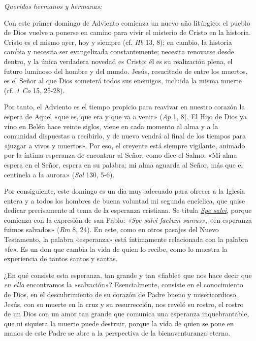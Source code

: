 \emph{Queridos hermanos y hermanas:}

Con este primer domingo de Adviento comienza un nuevo año litúrgico: el
pueblo de Dios vuelve a ponerse en camino para vivir el misterio de
Cristo en la historia. Cristo es el mismo ayer, hoy y siempre (cf.
\emph{Hb} 13, 8); en cambio, la historia cambia y necesita ser
evangelizada constantemente; necesita renovarse desde dentro, y la única
verdadera novedad es Cristo: él es su realización plena, el futuro
luminoso del hombre y del mundo. Jesús, resucitado de entre los muertos,
es el Señor al que Dios someterá todos sus enemigos, incluida la misma
muerte (cf. \emph{1 Co} 15, 25-28).

Por tanto, el Adviento es el tiempo propicio para reavivar en nuestro
corazón la espera de Aquel «que es, que era y que va a venir» (\emph{Ap}
1, 8). El Hijo de Dios ya vino en Belén hace veinte siglos, viene en
cada momento al alma y a la comunidad dispuestas a recibirlo, y de nuevo
vendrá al final de los tiempos para «juzgar a vivos y muertos». Por eso,
el creyente está siempre vigilante, animado por la íntima esperanza de
encontrar al Señor, como dice el Salmo: «Mi alma espera en el Señor,
espera en su palabra; mi alma aguarda al Señor, más que el centinela a
la aurora» (\emph{Sal} 130, 5-6).

Por consiguiente, este domingo es un día muy adecuado para ofrecer a la
Iglesia entera y a todos los hombres de buena voluntad mi segunda
encíclica, que quise dedicar precisamente al tema de la esperanza
cristiana. Se titula
\emph{\href{/content/benedict-xvi/es/encyclicals/documents/hf_ben-xvi_enc_20071130_spe-salvi.html}{Spe
		salvi}}, porque comienza con la expresión de san Pablo: \emph{«Spe salvi
	factum sumus»}, «en esperanza fuimos salvados» (\emph{Rm} 8, 24). En
este, como en otros pasajes del Nuevo Testamento, la palabra «esperanza»
está íntimamente relacionada con la palabra «fe». Es un don que cambia
la vida de quien lo recibe, como lo muestra la experiencia de tantos
santos y santas.

¿En qué consiste esta esperanza, tan grande y tan «fiable» que nos hace
decir que \emph{en ella} encontramos la «salvación»? Esencialmente,
consiste en el conocimiento de Dios, en el descubrimiento de su corazón
de Padre bueno y misericordioso. Jesús, con su muerte en la cruz y su
resurrección, nos reveló su rostro, el rostro de un Dios con un amor tan
grande que comunica una esperanza inquebrantable, que ni siquiera la
muerte puede destruir, porque la vida de quien se pone en manos de este
Padre se abre a la perspectiva de la bienaventuranza eterna.

